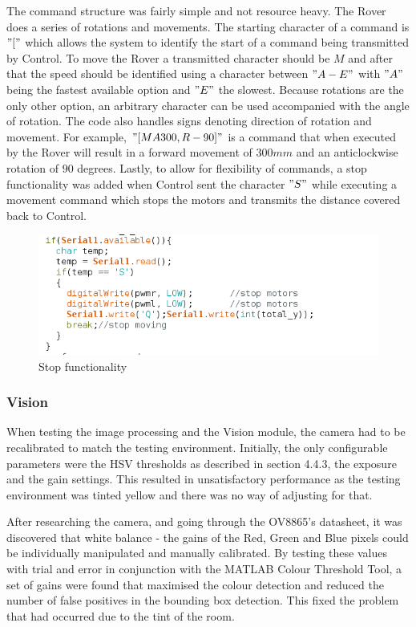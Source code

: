 \documentclass[a4paper]{article}
\begin{document}
 The command structure was fairly simple and not resource heavy. The Rover does a series of rotations and movements. The starting character of a command is \("["\) which allows the system to identify the start of a command being transmitted by Control. To move the Rover a transmitted character should be \(M\) and after that the speed should be identified using a character between \("A-E"\) with \("A"\) being the fastest available option and \("E"\) the slowest.
Because rotations are the only other option, an arbitrary character can be used accompanied with the angle of rotation. The code also handles signs denoting direction of rotation and movement.
For example, \("[MA300,R-90]"\) is a command that when executed by the Rover will result in a forward movement of \(300mm\) and an anticlockwise rotation of \(90\) degrees.
Lastly, to allow for flexibility of commands, a stop functionality was added when Control sent the character \("S"\) while executing a movement command which stops the motors and transmits the distance covered back to Control.
\begin{figure}[H]
    \centering
    \includegraphics[scale=0.5]{./images/Stop_functionality.png}
    \caption{Stop functionality}
    \label{image:Stopfunctionality}
 \end{figure}

 \subsubsection{Vision}
    When testing the image processing and the Vision module, the camera had to 
    be recalibrated to match the testing environment. Initially, the only configurable
    parameters were the HSV thresholds as described in section 4.4.3, the exposure and
    the gain settings. This resulted in unsatisfactory performance as the testing environment
    was tinted yellow and there was no way of adjusting for that. 

    After researching the camera, and going through the OV8865's datasheet, \cite{OV8865DataSheet} it was discovered
    that white balance - the gains of the Red, Green and Blue pixels could be individually manipulated
    and manually calibrated. By testing these values with trial and error in conjunction with the 
    MATLAB Colour Threshold Tool, a set of gains were found that maximised the colour detection and
    reduced the number of false positives in the bounding box detection. This fixed the problem that 
    had occurred due to the tint of the room. 
\end{document}
